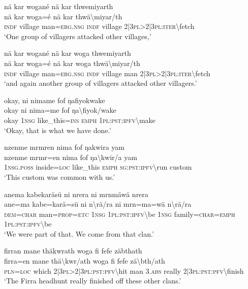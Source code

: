 \ea\label{ex:4:a1798}
nä kar wogané nä kar thwemiyarth\\
\gll nä	kar	woga=é	nä	kar	thwä{\textbackslash}miyar/th\\
     \textsc{indf}	village	man=\textsc{erg}.\textsc{nsg}	\textsc{indf}	village	2|3\textsc{pl}>2|3\textsc{pl}:\textsc{iter}{\textbackslash}fetch\\
\glt `One group of villagers attacked other villages,'
\z

\ea\label{ex:4:a1799}
nä kar wogané nä kar woga thwemiyarth\\
\gll nä	kar	woga=é	nä	kar	woga	thwä{\textbackslash}miyar/th\\
     \textsc{indf}	village	man=\textsc{erg}.\textsc{nsg}	\textsc{indf}	village	man	2|3\textsc{pl}>2|3\textsc{pl}:\textsc{iter}{\textbackslash}fetch\\
\glt `and again another group of villagers attacked other villagers.'
\z

\ea\label{ex:4:a1800}
okay, ni nimame fof ŋafiyokwake\\
\gll okay	ni	nima=me	fof	ŋa{\textbackslash}fiyok/wake\\
     okay	1\textsc{nsg}	like\_this=\textsc{ins}	\textsc{emph}	1\textsc{pl}:\textsc{pst}:\textsc{ipfv}{\textbackslash}make\\
\glt `Okay, that is what we have done.'
\z

\ea\label{ex:4:a1801}
nzenme mrmren nima fof ŋakwira yam\\
\gll nzenme	mrmr=en	nima	fof	ŋa{\textbackslash}kwir/a	yam\\
     1\textsc{nsg}.\textsc{poss}	inside=\textsc{loc}	like\_this	\textsc{emph}	\textsc{sg}:\textsc{pst}:\textsc{ipfv}{\textbackslash}run	custom\\
\glt `This custom was common with us.'
\z

\ea\label{ex:4:a1802}
anema kabekaräsü ni nrera ni mrnmäwä nrera\\
\gll ane=ma	kabe=karä=sü	ni	n{\textbackslash}rä/ra	ni	mrn=ma=wä	n{\textbackslash}rä/ra\\
     \textsc{dem}=\textsc{char}	man=\textsc{prop}=\textsc{etc}	1\textsc{nsg}	1\textsc{pl}:\textsc{pst}:\textsc{ipfv}{\textbackslash}be	1\textsc{nsg}	family=\textsc{char}=\textsc{emph}	1\textsc{pl}:\textsc{pst}:\textsc{ipfv}{\textbackslash}be\\
\glt `We were part of that. We come from that clan.'
\z

\ea\label{ex:4:a1803}
firran mane thäkwrath woga fi fefe zäbthath\\
\gll firra=en	mane	thä{\textbackslash}kwr/ath	woga	fi	fefe	zä{\textbackslash}bth/ath\\
     \textsc{pln}=\textsc{loc}	which	2|3\textsc{pl}>2|3\textsc{pl}:\textsc{pst}:\textsc{pfv}{\textbackslash}hit	man	3.\textsc{abs}	really	2|3\textsc{pl}:\textsc{pst}:\textsc{pfv}{\textbackslash}finish\\
\glt `The Firra headhunt really finished off these other clans.'
\z

